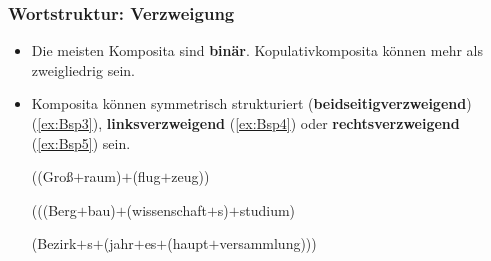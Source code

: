 \begin{frame}
\frametitle{Wortstruktur: Verzweigung}

\begin{itemize}
	\item Die meisten Komposita sind \textbf{binär}. Kopulativkomposita können mehr als zweigliedrig sein.

\scalebox{.8}{
\begin{forest}
		[A
			[A [rot]]
			[A [rot]]
			[A [grün]]
		]
\end{forest}	
}
	
	
	\item Komposita können symmetrisch strukturiert (\textbf{beidseitigverzweigend}) (\ref{ex:Bsp3}), \textbf{linksverzweigend} (\ref{ex:Bsp4}) oder \textbf{rechtsverzweigend} (\ref{ex:Bsp5}) sein.
	
	\ea \label{ex:Bsp3} {((Groß$+$raum)$+$(flug$+$zeug))}
	
	\ex \label{ex:Bsp4} {(((Berg$+$bau)$+$(wissenschaft$+$s)$+$studium)}
	
	\ex \label{ex:Bsp5} (Bezirk$+$s$+$(jahr$+$es$+$(haupt$+$versammlung)))
	\z

	
\end{itemize}

%

\end{frame}


